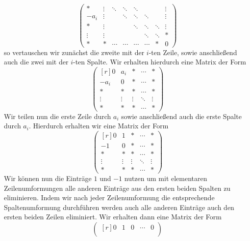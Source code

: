 \begin{enumerate}
\[\begin{pmatrix}
        *       & \vdots  & \ddots  & \ddots  & \ddots  &         &         & \vdots  \\
        -a_i    & \vdots  &         & \ddots  & \ddots  & \ddots  &         & \vdots  \\
        *       & \vdots  &         &         & \ddots  & \ddots  & \ddots  & \vdots  \\
        \vdots  & \vdots  &         &         &         & \ddots  & \ddots  & *       \\
        *       & *       & \cdots  & \cdots  & \cdots  & \cdots  & *       & 0
      \end{pmatrix}
    \]
    so vertauschen wir zunächst die zweite mit der $i$-ten Zeile, sowie anschließend auch die zwei mit der $i$-ten Spalte.
    Wir erhalten hierdurch eine Matrix der Form
    \[
      \begin{pmatrix*}[r]
         0      & a_i     & *       & \cdots  & *       \\
        -a_i    & 0       & *       & \cdots  & *       \\
         *      & *       & *       & \cdots  & *       \\
         \vdots & \vdots  & \vdots  & \ddots  & \vdots  \\
         *      & *       & *       & \cdots  & *
      \end{pmatrix*}
    \]
    Wir teilen nun die erste Zeile durch $a_i$ sowie anschließend auch die erste Spalte durch $a_i$.
    Hierdurch erhalten wir eine Matrix der Form
    \[
      \begin{pmatrix*}[r]
         0      & 1       & *       & \cdots  & *       \\
        -1      & 0       & *       & \cdots  & *       \\
         *      & *       & *       & \cdots  & *       \\
         \vdots & \vdots  & \vdots  & \ddots  & \vdots  \\
         *      & *       & *       & \cdots  & *
      \end{pmatrix*}
    \]
    Wir können nun die Einträge $1$ und $-1$ nutzen um mit elementaren Zeilenumformungen alle anderen Einträge aus den ersten beiden Spalten zu eliminieren.
    Indem wir nach jeder Zeilenumformung die entsprechende Spaltenumformung durchführen werden auch alle anderen Einträge auch den ersten beiden Zeilen eliminiert.
    Wir erhalten dann eine Matrix der Form
    \[
      \begin{pmatrix*}[r]
         0      & 1       & 0       & \cdots  & 0       \\

\end{pmatrix*}\]
\end{enumerate}
